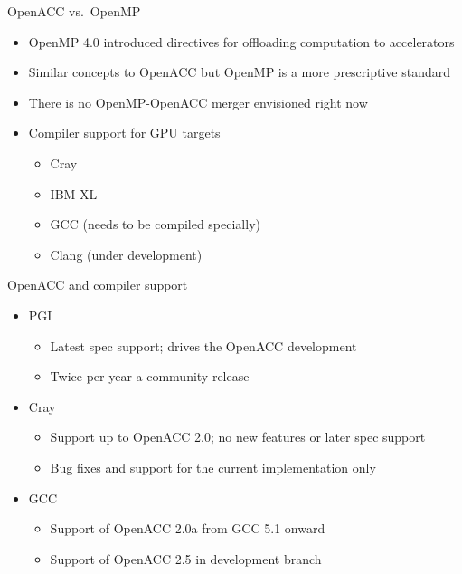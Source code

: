 \documentclass[12pt,aspectratio=169]{beamer}
\begin{document}
\begin{frame}{OpenACC vs.\ OpenMP}
  \begin{itemize}
    \vfill
  \item OpenMP 4.0 introduced directives for offloading computation to accelerators
    \vfill
  \item Similar concepts to OpenACC but OpenMP is a more prescriptive standard
    \vfill
  \item There is no OpenMP-OpenACC merger envisioned right now
    \vfill
  \item Compiler support for GPU targets
    \begin{itemize}
    \item Cray
    \item IBM XL
    \item GCC (needs to be compiled specially)
    \item Clang (under development)
    \end{itemize}
  \end{itemize}
\end{frame}

\begin{frame}{OpenACC and compiler support}
  \begin{itemize}
  \item PGI
    \begin{itemize}
    \item Latest spec support; drives the OpenACC development
    \item Twice per year a community release
    \end{itemize}
  \item Cray
    \begin{itemize}
    \item Support up to OpenACC 2.0; no new features or later spec support
    \item Bug fixes and support for the current implementation only
    \end{itemize}
  \item GCC
    \begin{itemize}
    \item Support of OpenACC 2.0a from GCC 5.1 onward
    \item Support of OpenACC 2.5 in development branch
    \end{itemize}
  \end{itemize}
\end{frame}
\end{document}
